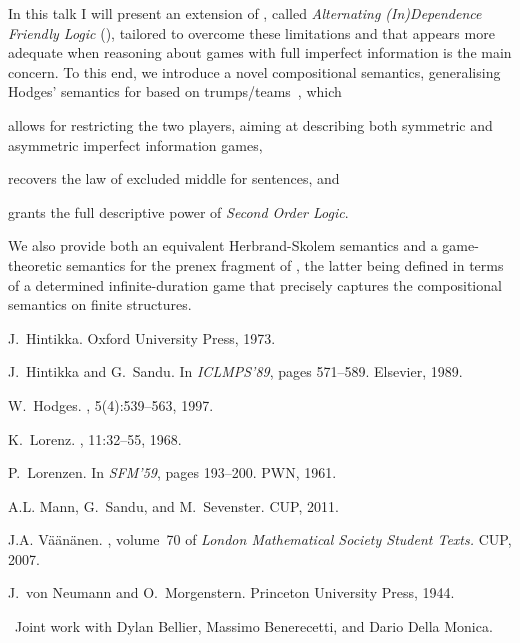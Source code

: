\documentclass[bsl, meeting, bibother]{asl}
\begin{document}
  In this talk I will present an extension of \IF, called \emph{Alternating
  (In)Dependence Friendly Logic} (\ADIF), tailored to overcome these limitations
  and that appears more adequate when reasoning about games with full imperfect
  information is the main concern.
  To this end, we introduce a novel compositional semantics, generalising
  Hodges' semantics for \IF based on trumps/teams~\cite{Hod97a,Vaa07,MSS11},
  which
  \begin{inparaenum}[(i)]
    \item
      allows for restricting the two players, aiming at describing both
      symmetric and asymmetric imperfect information games,
    \item
      recovers the law of excluded middle for sentences, and
    \item
      grants \ADIF the full descriptive power of \emph{Second Order Logic}.
  \end{inparaenum}
  We also provide both an equivalent Herbrand-Skolem semantics and a
  game-theoretic semantics for the prenex fragment of \ADIF, the latter being
  defined in terms of a determined infinite-duration game that precisely
  captures the compositional semantics on finite structures.

  \vspace{0.5em}

  \footnotesize
  

  \begin{thebibliography}{1}

  J.~Hintikka.
  \newblock Oxford University Press, 1973.

  J.~Hintikka and G.~Sandu.
  \newblock In {\em ICLMPS'89}, pages 571--589. Elsevier, 1989.

  W.~Hodges.
  , 5(4):539--563, 1997.

  K.~Lorenz.
  , 11:32--55, 1968.

  P.~Lorenzen.
  \newblock In {\em SFM'59}, pages 193--200. PWN, 1961.

  A.L. Mann, G.~Sandu, and M.~Sevenster.
  \newblock CUP, 2011.

  J.A. V{\"a}{\"a}n{\"a}nen.
  , volume~70 of {\em {London Mathematical Society Student Texts.}}
  \newblock CUP, 2007.

  J.~von Neumann and O.~Morgenstern.
  \newblock Princeton University Press, 1944.

  \end{thebibliography}

  \normalsize
  \noindent
  \ddag~Joint work with Dylan Bellier, Massimo Benerecetti, and Dario Della
  Monica.
\end{document}
